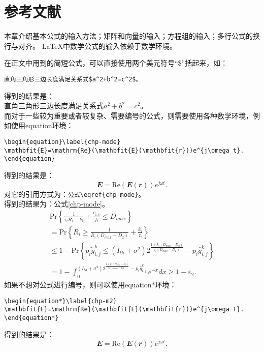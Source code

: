\chapter{参考文献}
\label{chap:equ}
本章介绍基本公式的输入方法；矩阵和向量的输入；方程组的输入；多行公式的换行与对齐。
\LaTeX 中数学公式的输入依赖于数学环境。

在正文中用到的简短公式，可以直接使用两个美元符号“\$”括起来，如：
\begin{verbatim}
直角三角形三边长度满足关系式$a^2+b^2=c^2$。
\end{verbatim}
得到的结果是：\\
直角三角形三边长度满足关系式$a^2+b^2=c^2$。\\

而对于一些较为重要或者较复杂、需要编号的公式，则需要使用各种数学环境，例如使用equation环境：
\begin{verbatim}
\begin{equation}\label{chp-mode}
\mathbfit{E}=\mathrm{Re}(\mathbfit{E}(\mathbfit{r}))e^{j\omega t}.
\end{equation}
\end{verbatim}
得到的结果是：
\begin{equation}\label{chp-mode}
\mathbfit{E}=\mathrm{Re}(\mathbfit{E}(\mathbfit{r}))e^{j\omega t}.
\end{equation}
对它的引用方式为：\verb|公式\eqref{chp-mode}|。\\
得到的结果为：公式\eqref{chp-mode}。
\begin{equation}\label{E24}
\begin{array}{ll}
\textrm{Pr}\left\{\frac{1}{\tau_iR_i-k_i}+\frac{c_{i,e}}{f_i}\le D_{max}\right\}\\
=\textrm{Pr}\left\{R_i\geq\frac{1}{R_i\left(D_{max}-D_2\right)}+\frac{k_i}{\tau_i}\right\}\\
\!\le1\!-\!\textrm{Pr}\left\{p_i{\widetilde{g}}_{i,j}^k\le\left(I_{th}+\sigma^2\right)2^\frac{1+k_i\left(D_{max}-D_2\right)}{\tau_i\left(D_{max}-D_2\right)}-p_i{\hat{g}}_{i,j}^k\right\}\\
=\!1\!-\!\int_{0}^{\left(I_{th}+\sigma^2\right)2^\frac{1+k_i\left(D_{max}-D_2\right)}{\tau_i\left(D_{max}-D_2\right)}-p_i{\hat{g}}_{i,j}^k}{e^{-x}dx}\!\geq\!1-\varepsilon_2.
\end{array}
\end{equation}
如果不想对公式进行编号，则可以使用equation*环境：
\begin{verbatim}
\begin{equation*}\label{chp-m2}
\mathbfit{E}=\mathrm{Re}(\mathbfit{E}(\mathbfit{r}))e^{j\omega t}.
\end{equation*}
\end{verbatim}
得到的结果是：
\begin{equation*}\label{chp-m2}
\mathbfit{E}=\mathrm{Re}(\mathbfit{E}(\mathbfit{r}))e^{j\omega t}.
\end{equation*}

